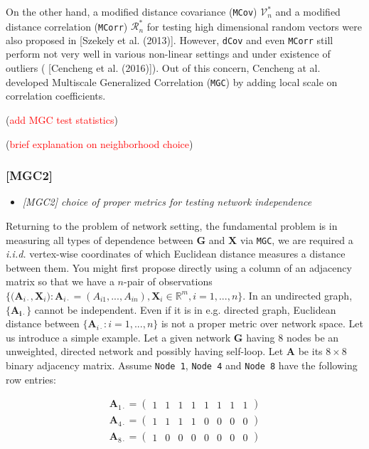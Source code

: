 \documentclass[12pt]{article}
\theoremstyle{definition}
\begin{document}
On the other hand, a modified distance covariance (\texttt{MCov}) $\mathcal{V}^*_{n}$ and a modified distance correlation (\texttt{MCorr}) $\mathcal{R}^{*}_{n}$ for testing high dimensional random vectors were also proposed in [Szekely et al. (2013)].  
However, \texttt{dCov} and even \texttt{MCorr} still perform not very well in various non-linear settings and under existence of outliers ( [Cencheng et al. (2016)]). Out of this concern, Cencheng at al. developed Multiscale Generalized Correlation (\texttt{MGC}) by adding local scale on correlation coefficients. 
	 
(\textcolor{red}{add MGC test statistics})

(\textcolor{red}{brief explanation on neighborhood choice})

\subsubsection{[MGC2]}
\begin{itemize}
	\item {\it  [MGC2] choice of proper metrics for testing network independence \/}
\end{itemize}

Returning to the problem of network setting, the fundamental problem is in measuring all types of dependence between $\boldsymbol{G}$ and $\boldsymbol{X}$ via \texttt{MGC}, we are required a \textit{i.i.d.} vertex-wise coordinates of which Euclidean distance measures a distance between them. You might first propose directly using a column of an adjacency matrix so that we have a $n$-pair of observations $\big\{ \big( \boldsymbol{A}_{i \cdot} , \boldsymbol{X}_{i} \big) : \boldsymbol{A}_{i \cdot} = (A_{i 1} , ... , A_{i n} ), \boldsymbol{X}_{i} \in \mathbb{R}^{m}, i=1,...,n  \big\}.$ In an undirected graph, $\{ \mathbf{A_{i \cdot}}  \}$ cannot be independent. Even if it is in e.g. directed graph, Euclidean distance between $\{ \boldsymbol{A}_{i \cdot} : i =1, ... , n \}$ is not a proper metric over network space. Let us introduce a simple example. Let a given network $\boldsymbol{G}$ having 8 nodes be an unweighted, directed network and possibly having self-loop. Let $\boldsymbol{A}$ be its $8 \times 8$ binary adjacency matrix. Assume \texttt{Node 1}, \texttt{Node 4} and \texttt{Node 8} have the following row entries:

\begin{equation}
\begin{gathered}
\boldsymbol{A}_{1 \cdot} = \left( \begin{array}{rrrrrrrr} 1 & 1 & 1 & 1 & 1 & 1 & 1 & 1 \end{array} \right) \\
\boldsymbol{A}_{4 \cdot} = \left( \begin{array}{rrrrrrrr} 1 & 1 & 1 & 1 & 0 & 0 & 0 & 0 \end{array} \right) \\
\boldsymbol{A}_{8 \cdot} = \left( \begin{array}{rrrrrrrr} 1 & 0 & 0 & 0 & 0 & 0 & 0 & 0 \end{array} \right)
\end{gathered}
\end{equation}
\end{document}
